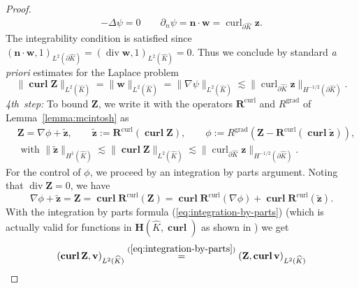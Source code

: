 \documentclass{article}
\begin{document}
\begin{proof}
\begin{align*}
-\Delta \psi = 0 \qquad \partial_n \psi = {\mathbf n} \cdot {\mathbf w} = 
\operatorname{curl}_{\partial\widehat{K}} {\mathbf z}.
\end{align*}
The integrability condition is satisfied since
$( {\mathbf n} \cdot {\mathbf w},1)_{L^2(\partial\widehat{K})} 
= (\operatorname{div} {\mathbf w},1)_{L^2(\widehat{K})} = 0$. 
Thus we conclude by standard {\sl a priori} estimates for the Laplace problem
\begin{equation}
\label{eq:lemma:X-1/2-vs-H-1/2-curl-45-vorn}
\|\operatorname{\mathbf{curl}} {\mathbf Z}\|_{L^2(\widehat{K})} = 
\|{\mathbf w}\|_{L^2(\widehat{K})} = \|\nabla \psi\|_{L^2(\widehat{K})} 
\lesssim \|\operatorname{curl}_{\partial\widehat{K}} {\mathbf z}\|_{H^{-1/2}(\partial\widehat{K})}. 
\end{equation}
\emph{4th~step:} To bound ${\mathbf Z}$, we write it with the operators 
${\mathbf R}^{\operatorname{curl}}$ and $R^{\operatorname{grad}}$ of Lemma~\ref{lemma:mcintosh} as 
\begin{align}
\label{eq:lemma:X-1/2-vs-H-1/2-curl-50-vorn}
& {\mathbf Z} = \nabla \phi + \widetilde {\mathbf z}, 
\qquad \widetilde {\mathbf z}:= {\mathbf R}^{\operatorname{curl}}(\operatorname{\mathbf{curl}}{\mathbf Z}), 
\qquad \phi := R^{\operatorname{grad}} ({\mathbf Z} - \mathbf{R}^{\operatorname{curl}}(\operatorname{\mathbf {curl}} \widetilde {\mathbf z})), \\
\label{eq:lemma:X-1/2-vs-H-1/2-curl-100-vorn}
& \mbox{ with }  
\|\widetilde {\mathbf z}\|_{H^1(\widehat{K})} \lesssim \|\operatorname{\mathbf{curl}} {\mathbf Z}\|_{L^2(\widehat{K})} 
\lesssim \|\operatorname{curl}_{\partial\widehat{K}} {\mathbf z}\|_{H^{-1/2}(\partial\widehat{K})}.
\end{align}
For the control of $\phi$, we proceed by an integration by parts argument.
Noting that $\operatorname{div} {\mathbf Z} = 0$, we have
$$
\nabla \phi + \widetilde {\mathbf z} = {\mathbf Z} 
= \operatorname{\mathbf{curl}} {\mathbf R}^{\operatorname{curl}} ({\mathbf  Z}) 
= \operatorname{\mathbf{curl}} {\mathbf R}^{\operatorname{curl}}  (\nabla \phi) 
  + \operatorname{\mathbf{curl}} {\mathbf R}^{\operatorname{curl}} (\widetilde {\mathbf z}).  
$$
With the integration by parts formula (\ref{eq:integration-by-parts}) (which is actually
valid for functions in ${\mathbf H}(\widehat K,\operatorname{\mathbf{curl}})$ as shown in 
\cite[Thm.~{3.29}]{Monkbook}) we get 
\[
(\operatorname{\mathbf{curl}} {\mathbf Z}, {\mathbf v})_{L^2(\widehat{K})} 
\stackrel{(\ref{eq:integration-by-parts})}{= }
({\mathbf Z}, \operatorname{\mathbf{curl}} {\mathbf v})_{L^2(\widehat{K})} 
\]
\end{proof}
\end{document}
